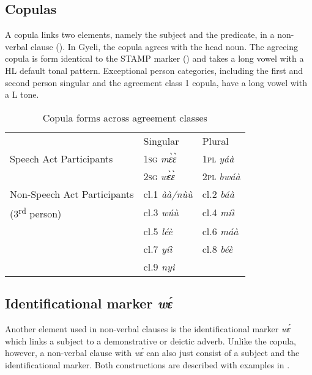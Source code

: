 \subsection{Copulas}
\label{sec:Copulas}

A copula links two elements, namely the subject and the predicate, in a non-verbal clause (). In Gyeli, the copula agrees with the head noun. The agreeing copula is form identical to the STAMP marker () and takes a long vowel with a HL default tonal pattern. Exceptional person categories, including the first and second person singular and the agreement class 1 copula, have a long vowel with a L tone.

\begin{table} 
\centering
\begin{tabular}{l|l|l}
 \midrule
 & Singular & Plural \\

Speech Act Participants & 1\textsc{sg} {\itshape mɛ̀ɛ̀} & 1\textsc{pl} {\itshape yáà} \\
 & 2\textsc{sg} {\itshape wɛ̀ɛ̀} & 2\textsc{pl} {\itshape bwáà} \\
 \midrule
Non-Speech Act Participants & cl.1 {\itshape àà/nùù} & cl.2 {\itshape báà} \\
(3\textsuperscript{rd} person) & cl.3 {\itshape wúù} & cl.4  {\itshape míì} \\
& cl.5 {\itshape léè} & cl.6 {\itshape máà} \\
 & cl.7 {\itshape yíì} & cl.8 {\itshape béè} \\
&  cl.9 {\itshape nyì} & \\
 \midrule
\end{tabular}
\caption{Copula forms across agreement classes}
\label{Tab:COP}
\end{table}




\subsection{Identificational marker {\itshape wɛ́}}
\label{sec:IDwe}

Another element used in non-verbal clauses is the identificational marker {\itshape wɛ́} which links a subject to a demonstrative or deictic adverb. Unlike the copula, however, a non-verbal clause with {\itshape wɛ́} can also just consist of a subject and the identificational marker. Both constructions are described with examples in .


